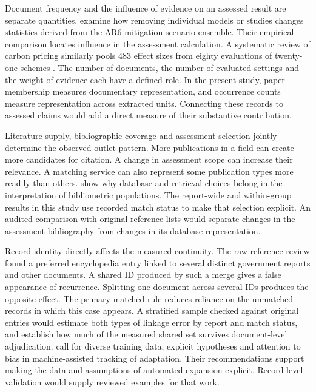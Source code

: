 \documentclass[11pt,a4paper]{article}
\begin{document}
Document frequency and the influence of evidence on an assessed result are separate quantities. \citet{sognnaes2025influence} examine how removing individual models or studies changes statistics derived from the AR6 mitigation scenario ensemble. Their empirical comparison locates influence in the assessment calculation. A systematic review of carbon pricing similarly pools 483 effect sizes from eighty evaluations of twenty-one schemes \citep{dobbeling2024carbonpricing}. The number of documents, the number of evaluated settings and the weight of evidence each have a defined role. In the present study, paper membership measures documentary representation, and occurrence counts measure representation across extracted units. Connecting these records to assessed claims would add a direct measure of their substantive contribution.

Literature supply, bibliographic coverage and assessment selection jointly determine the observed outlet pattern. More publications in a field can create more candidates for citation. A change in assessment scope can increase their relevance. A matching service can also represent some publication types more readily than others. \citet{liu2023retrieval,culbert2025coverage} show why database and retrieval choices belong in the interpretation of bibliometric populations. The report-wide and within-group results in this study use recorded match status to make that selection explicit. An audited comparison with original reference lists would separate changes in the assessment bibliography from changes in its database representation.

Record identity directly affects the measured continuity. The raw-reference review found a preferred encyclopedia entry linked to several distinct government reports and other documents. A shared ID produced by such a merge gives a false appearance of recurrence. Splitting one document across several IDs produces the opposite effect. The primary matched rule reduces reliance on the unmatched records in which this case appears. A stratified sample checked against original entries would estimate both types of linkage error by report and match status, and establish how much of the measured shared set survives document-level adjudication. \citet{sietsma2024tracking} call for diverse training data, explicit hypotheses and attention to bias in machine-assisted tracking of adaptation. Their recommendations support making the data and assumptions of automated expansion explicit. Record-level validation would supply reviewed examples for that work.
\end{document}
